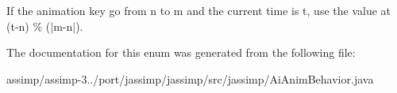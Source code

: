 If the animation key go from n to m and the current time is t, use the value at (t-\/n) \% ($\vert$m-\/n$\vert$). 

The documentation for this enum was generated from the following file\+:\begin{DoxyCompactItemize}
\item 
assimp/assimp-\/3../port/jassimp/jassimp/src/jassimp/Ai\+Anim\+Behavior.\+java\end{DoxyCompactItemize}
